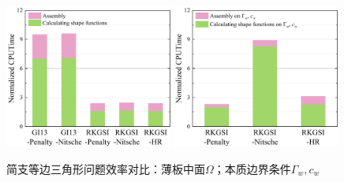\begin{figure}[H]
    \centering
    \begin{subcaptiongroup}
    \includegraphics[width=0.49\textwidth]{figure/PHR/T/Cefficiencyomega.png}
    \label{Cefficiencyomega}
    \includegraphics[width=0.49\textwidth]{figure/PHR/T/Cefficiencygamma.png}
    \label{Cefficiencygamma}
    \end{subcaptiongroup}
\caption{简支等边三角形问题效率对比：薄板中面$\Omega$；本质边界条件$\Gamma_w,c_w$}
\label{Tefficiency}
\end{figure}

